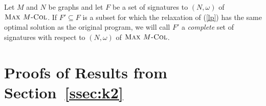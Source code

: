 \documentclass[11pt,a4paper]{article}
\begin{document}
Let $M$ and $N$ be graphs and
let $F$ be a set of signatures to $(N,\omega)$ of $\mbox{\sc Max $M$-Col}$.
If $F' \subseteq F$ is a subset for which the relaxation of (\ref{lp}) 
has the same optimal solution as the original program,
we will call $F'$ a \emph{complete} set of signatures with respect to
$(N,\omega)$ of $\mbox{\sc Max $M$-Col}$.

\section{Proofs of Results from Section~\ref{ssec:k2}}
\end{document}
